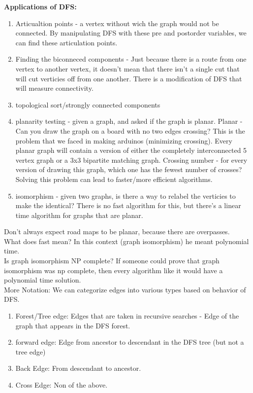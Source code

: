 \documentclass[12pt]{article}   	%
\begin{document}
{\bf Applications of DFS:}
\begin{enumerate}
\item Articualtion points - a vertex without wich the graph would not be connected. By manipulating DFS with these pre and postorder variables, we can find these articulation points.
\item Finding the biconneced components - Just because there is a route from one vertex to another vertex, it doesn't mean that there isn't a single cut that will cut verticies off from one another. There is a modification of DFS that will measure connectivity.
\item topological sort/strongly connected components
\item planarity testing - given a graph, and asked if the graph is planar. Planar - Can you draw the graph on a board with no two edges crossing? This is the problem that we faced in making arduinos (minimizing crossing). Every planar graph will contain a version of either the completely interconnected 5 vertex graph or a 3x3 bipartite matching graph.
Crossing number - for every version of drawing this graph, which one has the fewest number of crosses? Solving this problem can lead to faster/more efficient algorithms.
\item isomorphism - given two graphs, is there a way to relabel the verticies to make the identical? There is no fast algorithm for this, but there's a linear time algorithm for graphs that are planar.
\end{enumerate}

Don't always expect road maps to be planar, because there are overpasses.\\
What does fast mean? In this context (graph isomorphism) he meant polynomial time. \\ Is graph isomorphism NP complete? If someone could prove that graph isomorphism was np complete, then every algorithm like it would have a polynomial time solution.\\

More Notation: We can categorize edges into various types based on behavior of DFS.
\begin{enumerate}
\item Forest/Tree edge: Edges that are taken in recursive searches - Edge of the graph that appears in the DFS forest.
\item forward edge: Edge from ancestor to descendant in the DFS tree (but not a tree edge)
\item Back Edge: From descendant to ancestor.
\item Cross Edge: Non of the above.
\end{enumerate}
\end{document}
